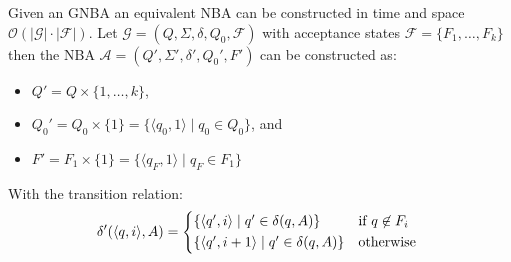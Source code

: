 \begin{definition}
Given an GNBA an equivalent NBA can be constructed in time and space $\mathcal{O}(|\mathcal{G}|\cdot|\mathcal{F}|)$. Let $\mathcal{G}=(Q,\Sigma,\delta,Q_0,\mathcal{F})$ with acceptance states $\mathcal{F}=\{F_1,\ldots,F_k\}$ then the NBA $\mathcal{A}=(Q',\Sigma',\delta',Q_0',F')$ can be constructed as:
\begin{itemize}
    \item $Q'=Q\times \{1,\ldots,k\}$,
    \item $Q_0'=Q_0 \times \{1\} = \{\langle q_0,1 \rangle \mid q_0 \in Q_0\}$, and
    \item $F'=F_1 \times \{1\} = \{\langle q_F,1 \rangle \mid q_F \in F_1\}$
\end{itemize}
With the transition relation:
\begin{equation*}
    \delta'(\langle q,i \rangle, A)=
    \begin{cases*}
      \{\langle q',i \rangle \mid q' \in \delta(q,A)\} & if $q \not\in F_i$ \\
      \{\langle q',i+1 \rangle \mid q' \in \delta(q,A)\}        & otherwise
    \end{cases*}
\end{equation*}
\end{definition}

